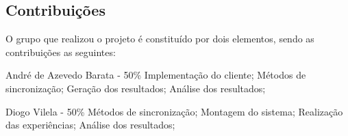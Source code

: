 \subsection{Contribuições}

O grupo que realizou o projeto é constituído por dois elementos, sendo as contribuições as seguintes:

\begin{outline}
    \1 André de Azevedo Barata - 50\%
        \2 Implementação do cliente;
        \2 Métodos de sincronização;
        \2 Geração dos resultados;
        \2 Análise dos resultados;
   
    \1 Diogo Vilela - 50\%
        \2 Métodos de sincronização;
        \2 Montagem do sistema;
        \2 Realização das experiências;
        \2 Análise dos resultados;
\end{outline}